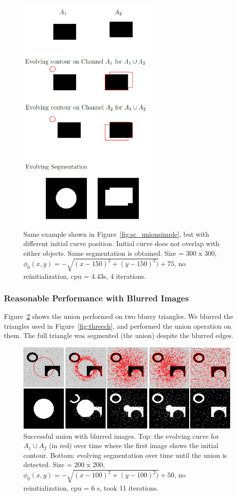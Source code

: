 \documentclass[10pt,twocolumn,letterpaper]{article}
\begin{document}
\begin{figure}[t]
\centering
\includegraphics[width=7cm]{sc_position.png}
\caption{Same example shown in Figure~\ref{fig:sc_unionsimple}, but with different initial curve position. Initial curve does not overlap with either objects.
Same segmentation is obtained. Size = 300 x 300, $\phi_{0}(x,y) = - \sqrt{(x - 150)^2 + (y - 150)^2)} + 75$,  no reinitialization, cpu = 4.43s, 4
iterations.}
\label{fig:sc_position}
\end{figure}

\subsubsection*{Reasonable Performance with Blurred Images}

Figure~\ref{fig:sc_blurry} shows the union performed on two blurry triangles. We blurred the triangles used in Figure~\ref{fig:threech}, and performed the
union operation on them. The full triangle was segmented (the union) despite the blurred edges.

\begin{figure}[t]
\centering
\includegraphics[width=12cm]{cv_eg11.png}
\caption{Successful union with blurred images. Top: the evolving curve for $A_1 \cup A_2$
(in red) over time where the first
image shows the initial
contour. Bottom: evolving segmentation over time until the union is detected. Size = 200 x 200, $\phi_{0}(x,y) = - \sqrt{(x - 100)^2 + (y - 100)^2)} +
50$, no reinitialization, cpu = 6 s, took 11 iterations.}
\label{fig:sc_blurry}
\end{figure}
\end{document}
